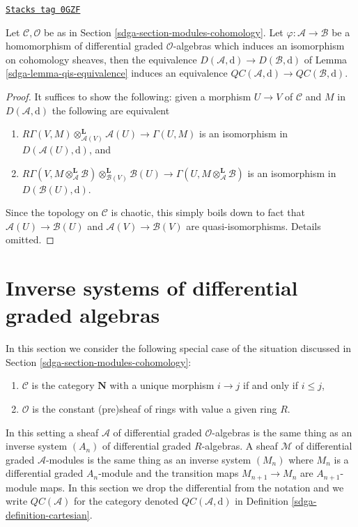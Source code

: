 \begin{lemma}
\label{sdga-lemma-cartesian-qis-equivalence}
\href{https://stacks.math.columbia.edu/tag/0GZF}{\texttt{Stacks tag 0GZF}}

Let $\mathcal{C}, \mathcal{O}$ be as in
Section \ref{sdga-section-modules-cohomology}. Let
$\varphi : \mathcal{A} \to \mathcal{B}$ be a homomorphism of
differential graded $\mathcal{O}$-algebras which induces an
isomorphism on cohomology sheaves, then the equivalence
$D(\mathcal{A}, \text{d}) \to D(\mathcal{B}, \text{d})$
of Lemma \ref{sdga-lemma-qis-equivalence} induces an equivalence
$\mathit{QC}(\mathcal{A}, \text{d}) \to
\mathit{QC}(\mathcal{B}, \text{d})$.
\end{lemma}

\begin{proof}
It suffices to show the following: given a morphism $U \to V$ of $\mathcal{C}$
and $M$ in $D(\mathcal{A}, \text{d})$ the following are equivalent
\begin{enumerate}
\item $R\Gamma(V, M) \otimes_{\mathcal{A}(V)}^\mathbf{L} \mathcal{A}(U)
\to \Gamma(U, M)$ is an isomorphism in $D(\mathcal{A}(U), \text{d})$, and
\item $R\Gamma(V, M \otimes_\mathcal{A}^\mathbf{L} \mathcal{B})
\otimes_{\mathcal{B}(V)}^\mathbf{L} \mathcal{B}(U)
\to \Gamma(U, M \otimes_\mathcal{A}^\mathbf{L} \mathcal{B})$
is an isomorphism in $D(\mathcal{B}(U), \text{d})$.
\end{enumerate}
Since the topology on $\mathcal{C}$ is chaotic, this simply boils down
to fact that $\mathcal{A}(U) \to \mathcal{B}(U)$ and
$\mathcal{A}(V) \to \mathcal{B}(V)$ are quasi-isomorphisms.
Details omitted.
\end{proof}

\section{Inverse systems of differential graded algebras}
\label{sdga-section-qc-inverse-system}
In this section we consider the following special case of the situation
discussed in Section \ref{sdga-section-modules-cohomology}:
\begin{enumerate}
\item $\mathcal{C}$ is the category $\mathbf{N}$
with a unique morphism $i \to j$ if and only if $i \leq j$,
\item $\mathcal{O}$ is the constant (pre)sheaf of rings with value
a given ring $R$.
\end{enumerate}
In this setting a sheaf $\mathcal{A}$ of differential graded
$\mathcal{O}$-algebras is the same thing as an inverse system
$(A_n)$ of differential graded $R$-algebras.
A sheaf $\mathcal{M}$ of differential graded $\mathcal{A}$-modules
is the same thing as an inverse system $(M_n)$ where $M_n$ is
a differential graded $A_n$-module and the transition maps
$M_{n + 1} \to M_n$ are $A_{n + 1}$-module maps.
In this section we drop the differential from the notation
and we write $\mathit{QC}(\mathcal{A})$ for the category
denoted $\mathit{QC}(\mathcal{A}, \text{d})$ in
Definition \ref{sdga-definition-cartesian}.

